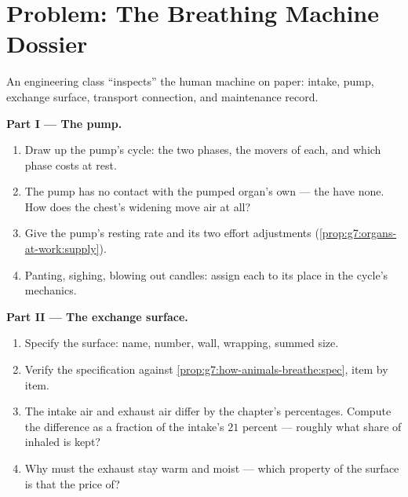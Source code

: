 \section{Problem: The Breathing Machine Dossier}

\begin{problem}\label{pb:g7:lungs-and-gas-exchange:1}
An engineering class ``inspects'' the human 
machine on paper: intake, pump, exchange surface,
transport connection, and maintenance record.

\medskip\noindent\textbf{Part I --- The pump.}
\begin{enumerate}
  \item Draw up the pump's cycle: the two phases, the
        movers of each, and which phase costs  at
        rest.
  \item The pump has no contact with the pumped organ's
        own  --- the  have none. How does the
        chest's widening move air at all?
  \item Give the pump's resting rate and its two effort
        adjustments
        (\cref{prop:g7:organs-at-work:supply}).
  \item Panting, sighing, blowing out candles: assign
        each to its place in the cycle's mechanics.
\end{enumerate}

\medskip\noindent\textbf{Part II --- The exchange
surface.}
\begin{enumerate}[resume]
  \item Specify the surface: name, number, wall,
        wrapping, summed size.
  \item Verify the specification against
        \cref{prop:g7:how-animals-breathe:spec}, item by
        item.
  \item The intake air and exhaust air differ by the
        chapter's percentages. Compute the 
        difference as a fraction of the intake's $21$
        percent --- roughly what share of inhaled 
        is kept?
  \item Why must the exhaust stay warm and moist ---
        which property of the surface is that the price
        of?
\end{enumerate}


\end{problem}
